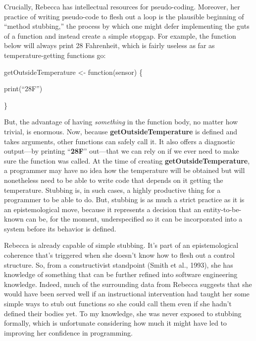 Crucially, Rebecca has intellectual resources for pseudo-coding.
Moreover, her practice of writing pseudo-code to flesh out a loop is the
plausible beginning of ``method stubbing,'' the process by which one
might defer implementing the guts of a function and instead create a
simple stopgap. For example, the function below will always print 28
Fahrenheit, which is fairly useless as far as temperature-getting
functions go:

getOutsideTemperature \textless{}- function(sensor) \{

print(``28F'')

\}

But, the advantage of having \emph{something} in the function body, no
matter how trivial, is enormous. Now, because
\textbf{getOutsideTemperature} is defined and takes arguments, other
functions can safely call it. It also offers a diagnostic output---by
printing ``\textbf{28F}'' out---that we can rely on if we ever need to
make sure the function was called. At the time of creating
\textbf{getOutsideTemperature}, a programmer may have no idea how the
temperature will be obtained but will nonetheless need to be able to
write code that depends on it getting the temperature. Stubbing is, in
such cases, a highly productive thing for a programmer to be able to do.
But, stubbing is as much a strict practice as it is an epistemological
move, because it represents a decision that an entity-to-be-known can
be, for the moment, underspecified so it can be incorporated into a
system before its behavior is defined.

Rebecca is already capable of simple stubbing. It's part of an
epistemological coherence that's triggered when she doesn't know how to
flesh out a control structure. So, from a constructivist standpoint
(Smith et al., 1993), she has knowledge of something that can be further
refined into software engineering knowledge. Indeed, much of the
surrounding data from Rebecca suggests that she would have been served
well if an instructional intervention had taught her some simple ways to
stub out functions so she could call them even if she hadn't defined
their bodies yet. To my knowledge, she was never exposed to stubbing
formally, which is unfortunate considering how much it might have led to
improving her confidence in programming.

